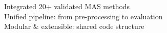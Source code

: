 \documentclass[preview]{standalone}
\begin{document}
Integrated 20+ validated MAS methods\\Unified pipeline: from pre-processing to evaluation\\Modular & extensible: shared code structure\\
\end{document}
